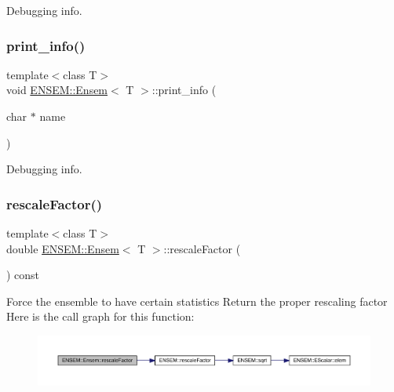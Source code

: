 Debugging info. 

\mbox{\label{classENSEM_1_1Ensem_a85302bace1110e35249c88486f88d80c}} 
\subsubsection{\texorpdfstring{print\_info()}{print\_info()}\hspace{0.1cm}{\footnotesize\ttfamily [3/3]}}
{\footnotesize\ttfamily template$<$class T$>$ \\
void \mbox{\hyperlink{classENSEM_1_1Ensem}{E\+N\+S\+E\+M\+::\+Ensem}}$<$ T $>$\+::print\+\_\+info (\begin{DoxyParamCaption}\item[{char $\ast$}]{name }\end{DoxyParamCaption})\hspace{0.3cm}{\ttfamily [inline]}}



Debugging info. 

\mbox{\label{classENSEM_1_1Ensem_aecf90199daafa73454e9c1aceef313a4}} 
\subsubsection{\texorpdfstring{rescaleFactor()}{rescaleFactor()}\hspace{0.1cm}{\footnotesize\ttfamily [1/3]}}
{\footnotesize\ttfamily template$<$class T$>$ \\
double \mbox{\hyperlink{classENSEM_1_1Ensem}{E\+N\+S\+E\+M\+::\+Ensem}}$<$ T $>$\+::rescale\+Factor (\begin{DoxyParamCaption}{ }\end{DoxyParamCaption}) const\hspace{0.3cm}{\ttfamily [inline]}}

Force the ensemble to have certain statistics Return the proper rescaling factor Here is the call graph for this function\+:
\nopagebreak
\begin{figure}[H]
\begin{center}
\leavevmode
\includegraphics[width=350pt]{d7/d3e/classENSEM_1_1Ensem_aecf90199daafa73454e9c1aceef313a4_cgraph}
\end{center}
\end{figure}
\mbox{\label{classENSEM_1_1Ensem_aecf90199daafa73454e9c1aceef313a4}} 
